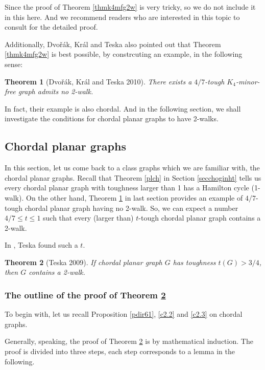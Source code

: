 \documentclass[12pt]{report}
\newtheorem{theorem}{Theorem}
\begin{document}
Since the proof of Theorem \ref{thmk4mfg2w} is very tricky, so we do not include it in this here. And we recommend readers who are interested in this topic to consult \cite{dvovrak2010toughness} for the detailed proof.

Additionally, Dvo{\v r}{\'a}k, Kr{\'a}l and Teska also pointed out that Theorem \ref{thmk4mfg2w} is best possible, by constrcuting an example, in the following sense:
\begin{theorem}[Dvo{\v r}{\'a}k, Kr{\'a}l and Teska 2010]\label{cedkt10thm2}
There exists a $4/7$-tough $K_4$-minor-free graph admits no 2-walk.
\end{theorem}

In fact, their example is also chordal. And in the following section, we shall investigate the conditions for chordal planar graphs to have 2-walks.







\subsection{Chordal planar graphs}

In this section, let us come back to a class graphs which we are familiar with, the chordal planar graphs. Recall that Theorem \ref{plch} in Section \ref{secchoginht} tells us every chordal planar graph with toughness larger than 1 has a Hamilton cycle (1-walk). On the other hand, Theorem \ref{cedkt10thm2} in last section provides an example of $4/7$-tough chordal planar graph having no 2-walk. So, we can expect a number $4/7\le t\le1$ such that every (larger than) $t$-tough chordal planar graph contains a 2-walk.

In \cite{teska20092}, Teska found such a $t$.
\begin{theorem}[Teska 2009]\label{thm34t2w1}
If chordal planar graph $G$ has toughness $t(G)>3/4$, then $G$ contains a 2-walk.
\end{theorem}


\subsubsection{The outline of the proof of Theorem \ref{thm34t2w1}}
To begin with, let us recall Proposition \ref{pdir61}, \ref{c2.2} and \ref{c2.3} on chordal graphs.

Generally, speaking, the proof of Theorem \ref{thm34t2w1} is by mathematical induction. The proof is divided into three steps, each step corresponds to a lemma in the following.
\end{document}

